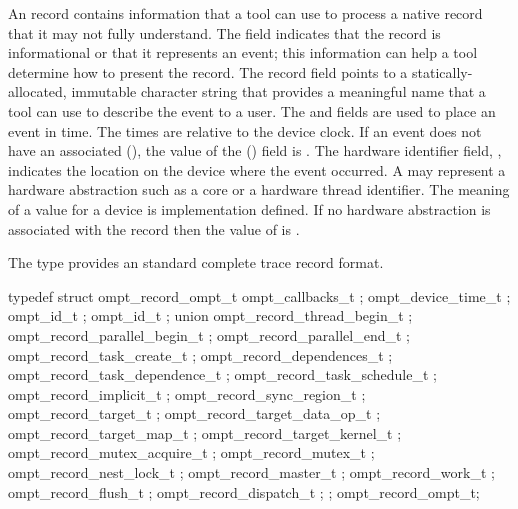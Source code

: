 An  record contains information that a tool can 
use to process a native record that it may not fully understand. The  
field indicates that the record is informational or that it represents an event; 
this information can help a tool determine how to present the record. The record 
 field points to a statically-allocated, immutable character string that 
provides a meaningful name that a tool can use to describe the event to a user. 
The  and  fields are used to place an event in time. 
The times are relative to the device clock. If an event does not have an associated 
 (), the value of the  ()
field is . The hardware identifier field, , indicates 
the location on the device where the event occurred. A  may represent a 
hardware abstraction such as a core or a hardware thread identifier. The meaning of 
a  value for a device is implementation defined. If no hardware abstraction 
is associated with the record then the value of  is .

\label{sec:ompt_record_ompt_t}

\summary
The  type provides an standard complete trace record format.

\format
\begin{ccppspecific}
\begin{omptRecord}
typedef struct ompt_record_ompt_t {
  ompt_callbacks_t ;
  ompt_device_time_t ;
  ompt_id_t ;
  ompt_id_t ;
  union {
    ompt_record_thread_begin_t ;
    ompt_record_parallel_begin_t ;
    ompt_record_parallel_end_t ;
    ompt_record_task_create_t ;
    ompt_record_dependences_t ;
    ompt_record_task_dependence_t ;
    ompt_record_task_schedule_t ;
    ompt_record_implicit_t ;
    ompt_record_sync_region_t ;
    ompt_record_target_t ;
    ompt_record_target_data_op_t ;
    ompt_record_target_map_t ;
    ompt_record_target_kernel_t ;
    ompt_record_mutex_acquire_t ;
    ompt_record_mutex_t ;
    ompt_record_nest_lock_t ;
    ompt_record_master_t ;
    ompt_record_work_t ;
    ompt_record_flush_t ;
    ompt_record_dispatch_t ;
  } ;
} ompt_record_ompt_t;
\end{omptRecord}
\end{ccppspecific}


